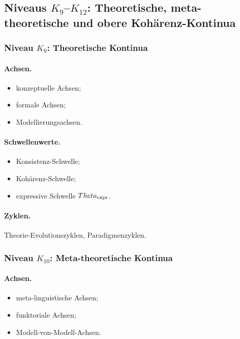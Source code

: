 \subsection{Niveaus \texorpdfstring{\texorpdfstring{$K_9$}{K\_9}–$K_{12}$}{K9–K12}: Theoretische, meta-theoretische und obere Kohärenz-Kontinua}

\subsubsection{Niveau \texorpdfstring{\(K_9\)}{K9}: Theoretische Kontinua}

\paragraph{Achsen.}
\begin{itemize}
    \item konzeptuelle Achsen;
    \item formale Achsen;
    \item Modellierungsachsen.
\end{itemize}

\paragraph{Schwellenwerte.}
\begin{itemize}
    \item Konsistenz-Schwelle;
    \item Kohärenz-Schwelle;
    \item expressive Schwelle \(\Theta_{\rm expr}\).
\end{itemize}

\paragraph{Zyklen.}
Theorie-Evolutionszyklen, Paradigmenzyklen.

\subsubsection{Niveau \(K_{10}\): Meta-theoretische Kontinua}

\paragraph{Achsen.}
\begin{itemize}
    \item meta-linguistische Achsen;
    \item funktoriale Achsen;
    \item Modell-von-Modell-Achsen.
\end{itemize}

